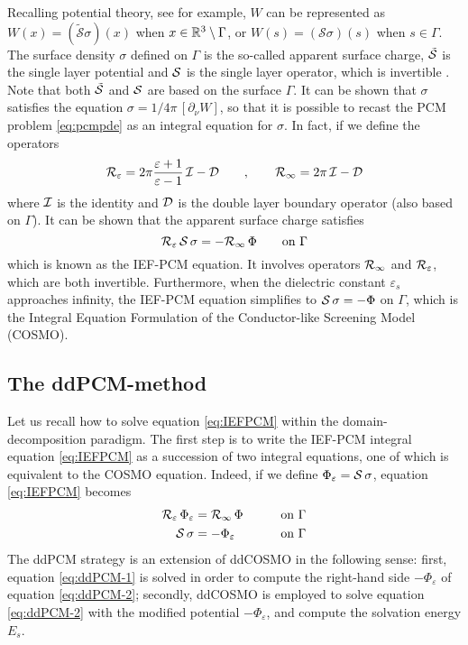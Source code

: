 Recalling potential theory, see for example\cite{sauter2010boundary}, $W$ can be represented as $W(x) = (\tilde{\mathcal{S}}\sigma)(x)$ when $x \in \mathbb{R}^3 \setminus \Gamma$, or $W(s) = (\mathcal{S}\sigma)(s)$ when $s \in \Gamma$. 
The surface density $\sigma$ defined on $\Gamma$ is the so-called apparent surface charge,  $\tilde{\mathcal{S}}$ is the single layer potential and $\mathcal{S}$ is the single layer operator,  which is invertible \cite{Calderon}. 
Note that both $\tilde{\mathcal{S}}$ and $\mathcal{S}$ are based on the surface $\Gamma$.
It can be shown that $\sigma$ satisfies the equation $\sigma = 1/4\pi \, [ \partial_\nu W]$, so that it is possible to recast the PCM problem \eqref{eq:pcmpde} as an integral equation for $\sigma$. In fact, if we define the operators 
\begin{equation}
 \label{eq:Reps}
 \mathcal{R}_\varepsilon = 2\pi \frac{\varepsilon+1}{\varepsilon-1} \, \mathcal{I} - \mathcal{D} \qquad, \qquad \mathcal{R}_\infty = 2\pi \, \mathcal{I} - \mathcal{D}
\end{equation}
where $\mathcal{I}$ is the identity and $\mathcal{D}$ is the double layer boundary operator (also based on $\Gamma$).
It can be shown\cite{ReviewPCM_2005} that the apparent surface charge satisfies
\begin{equation}
\label{eq:IEFPCM}
\mathcal{R}_\varepsilon \, \mathcal{S} \, \sigma = - \mathcal{R}_\infty \, \Phi \qquad \text{on }\Gamma
\end{equation}
which is known as the IEF-PCM equation. It involves operators $\mathcal{R}_\infty$ and $\mathcal{R}_\varepsilon$, which are both invertible. Furthermore, when the dielectric constant $\varepsilon_s$ approaches infinity, the IEF-PCM equation simplifies to $\mathcal{S} \, \sigma = - \Phi$ on $\Gamma$, which is the Integral Equation Formulation of the Conductor-like Screening Model (COSMO)\cite{Lipparini_JCP_VPCM}.


\subsection{The ddPCM-method}


Let us recall how to solve equation \eqref{eq:IEFPCM} within the domain-decomposition paradigm. The first step is to write the IEF-PCM integral equation \eqref{eq:IEFPCM} as a succession of two integral equations, one of which is equivalent to the COSMO equation\cite{Cances_Librone_PCM}. Indeed, if we define $\Phi_\varepsilon = \mathcal{S} \, \sigma$, equation \eqref{eq:IEFPCM} becomes
\begin{alignat}{3}
\mathcal{R}_\varepsilon \, \Phi_\varepsilon & = \mathcal{R}_\infty \, \Phi \qquad && \text{on }\Gamma  \label{eq:ddPCM-1} \\
\mathcal{S} \, \sigma & = -\Phi_\varepsilon  && \text{on }\Gamma \label{eq:ddPCM-2} 
\end{alignat}
The ddPCM strategy is an extension of ddCOSMO in the following sense: first, equation \eqref{eq:ddPCM-1} is solved in order to compute the right-hand side $-\Phi_\varepsilon$ of equation \eqref{eq:ddPCM-2}; secondly, ddCOSMO is employed to solve equation \eqref{eq:ddPCM-2} with the modified potential $-\Phi_\varepsilon$, and compute the solvation energy $E_s$.



